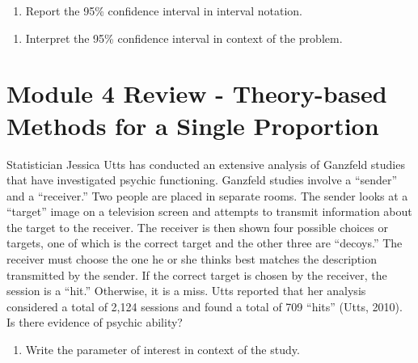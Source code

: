 \documentclass[
]{report}
\providecommand{\tightlist}{%
  \setlength{\itemsep}{0pt}\setlength{\parskip}{0pt}}
\begin{document}
\vspace{1in}

\begin{enumerate}
\def\labelenumi{\arabic{enumi}.}
\setcounter{enumi}{12}
\tightlist
\item
  Report the 95\% confidence interval in interval notation.
\end{enumerate}

\vspace{0.2in}

\begin{enumerate}
\def\labelenumi{\arabic{enumi}.}
\setcounter{enumi}{13}
\tightlist
\item
  Interpret the 95\% confidence interval in context of the problem.
\end{enumerate}

\vspace{0.8in}

\newpage

\section{Module 4 Review - Theory-based Methods for a Single Proportion}\label{module-4-review---theory-based-methods-for-a-single-proportion}

Statistician Jessica Utts has conducted an extensive analysis of Ganzfeld studies that have investigated psychic functioning. Ganzfeld studies involve a ``sender'' and a ``receiver.'' Two people are placed in separate rooms. The sender looks at a ``target'' image on a television screen and attempts to transmit information about the target to the receiver. The receiver is then shown four possible choices or targets, one of which is the correct target and the other three are ``decoys.'' The receiver must choose the one he or she thinks best matches the description transmitted by the sender. If the correct target is chosen by the receiver, the session is a ``hit.'' Otherwise, it is a miss. Utts reported that her analysis considered a total of 2,124 sessions and found a total of 709 ``hits'' (Utts, 2010). Is there evidence of psychic ability?

\begin{enumerate}
\def\labelenumi{\arabic{enumi}.}
\tightlist
\item
  Write the parameter of interest in context of the study.
\end{enumerate}

\vspace{0.6in}
\end{document}
